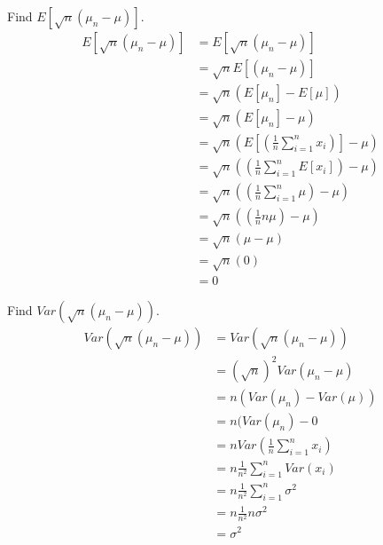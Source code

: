 \section{}

Find $E[\sqrt{n}(\mu_n - \mu)]$.
\begin{align*}
    E[\sqrt{n}(\mu_n - \mu)] &= E[\sqrt{n}(\mu_n - \mu)] \\
	&= \sqrt{n} E[(\mu_n - \mu)] \tag*{By Linearity of Expectation} \\
	&= \sqrt{n} (E[\mu_n] - E[\mu]) \\
	&= \sqrt{n} (E[\mu_n] - \mu) \\
	&= \sqrt{n} (E[(\frac{1}{n} \sum_{i=1}^n x_i)] - \mu) \\
	&= \sqrt{n} ((\frac{1}{n} \sum_{i=1}^n E[x_i]) - \mu) \\
	&= \sqrt{n} ((\frac{1}{n} \sum_{i=1}^n \mu) - \mu) \\
	&= \sqrt{n} ((\frac{1}{n} n\mu) - \mu) \\
	&= \sqrt{n} (\mu - \mu) \\
	&= \sqrt{n} (0) \\
	&= 0
\end{align*}

Find $Var(\sqrt{n}(\mu_n - \mu))$.
\begin{align*}
    Var(\sqrt{n}(\mu_n - \mu)) &= Var(\sqrt{n}(\mu_n - \mu)) \\ %
	&= (\sqrt{n})^2 Var(\mu_n - \mu) \\
	&= n (Var(\mu_n) - Var(\mu)) \\
	&= n (Var(\mu_n) - 0 \\
	&= n Var(\frac{1}{n} \sum_{i=1}^n x_i) \\
	&= n \frac{1}{n^2} \sum_{i=1}^n Var(x_i) \\
	&= n \frac{1}{n^2} \sum_{i=1}^n \sigma^2 \\
	&= n \frac{1}{n^2} n \sigma^2 \\
	&= \sigma^2
\end{align*}

